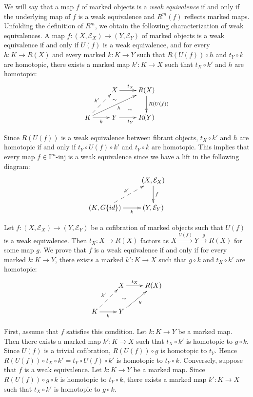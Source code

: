 \documentclass[reqno]{amsart}
\theoremstyle{definition}
\theoremstyle{remark}
\newcommand{\I}{\mathrm{I}}
\newcommand{\class}[2]{#1\text{-}\mathrm{#2}}
\newcommand{\Iinj}[1][\I]{\class{#1}{inj}}
\numberwithin{figure}{section}
\begin{document}
We will say that a map $f$ of marked objects is a \emph{weak equivalence}
if and only if the underlying map of $f$ is a weak equivalence and $R^m(f)$ reflects marked maps.
Unfolding the definition of $R^m$, we obtain the following characterization of weak equivalences.
A map $f : (X,\mathcal{E}_X) \to (Y,\mathcal{E}_Y)$ of marked objects is a weak equivalence if and only if $U(f)$ is a weak equivalence,
and for every $h : K \to R(X)$ and every marked $k : K \to Y$ such that $R(U(f)) \circ h$ and $t_{Y} \circ k$ are homotopic,
there exists a marked map $k' : K \to X$ such that $t_X \circ k'$ and $h$ are homotopic:
\[ \xymatrix{                                          & X \ar[r]^{t_X} \ar@{}[d]|(.35){\sim} \ar@{}[dr]_(.6){\sim} & R(X) \ar[d]^{R(U(f))} \\
              K \ar[r]_k \ar[urr]_h \ar@{-->}[ur]^{k'} & Y \ar[r]_{t_Y}                                             & R(Y)
            } \]

Since $R(U(f))$ is a weak equivalence between fibrant objects, $t_X \circ k'$ and $h$ are homotopic
if and only if $t_Y \circ U(f) \circ k'$ and $t_Y \circ k$ are homotopic.
This implies that every map $f \in \Iinj[\I^m]$ is a weak equivalence since we have a lift in the following diagram:
\[ \xymatrix{                                            & (X,\mathcal{E}_X) \ar[d]^f \\
              (K, G \{id\}) \ar[r]_-k \ar@{-->}[ur]^{k'} & (Y,\mathcal{E}_Y)
            } \]

Let $f : (X,\mathcal{E}_X) \to (Y,\mathcal{E}_Y)$ be a cofibration of marked objects such that $U(f)$ is a weak equivalence.
Then $t_X : X \to R(X)$ factors as $X \xrightarrow{U(f)} Y \xrightarrow{g} R(X)$ for some map $g$.
We prove that $f$ is a weak equivalence if and only if for every marked $k : K \to Y$, there exists a marked $k' : K \to X$ such that $g \circ k$ and $t_X \circ k'$ are homotopic:
\[ \xymatrix{                                                  & X \ar[r]^-{t_X} & R(X) \\
              K \ar[r]_k \ar@{-->}[ur]^{k'} \ar@{}[urr]|{\sim} & Y \ar[ur]_g
            } \]

First, assume that $f$ satisfies this condition.
Let $k : K \to Y$ be a marked map.
Then there exists a marked map $k' : K \to X$ such that $t_X \circ k'$ is homotopic to $g \circ k$.
Since $U(f)$ is a trivial cofibration, $R(U(f)) \circ g$ is homotopic to $t_Y$.
Hence $R(U(f)) \circ t_X \circ k' = t_Y \circ U(f) \circ k'$ is homotopic to $t_Y \circ k$.
Conversely, suppose that $f$ is a weak equivalence.
Let $k : K \to Y$ be a marked map.
Since $R(U(f)) \circ g \circ k$ is homotopic to $t_Y \circ k$, there exists a marked map $k' : K \to X$ such that $t_X \circ k'$ is homotopic to $g \circ k$.
\end{document}
